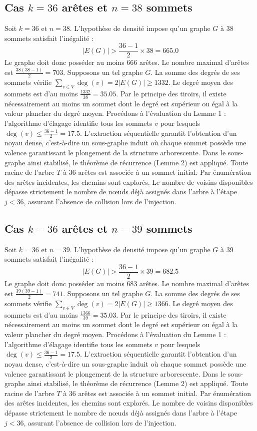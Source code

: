 \documentclass[12pt,a4paper]{article}
\begin{document}
\subsection{Cas $k = 36$ arêtes et $n = 38$ sommets}
Soit $k = 36$ et $n = 38$. L'hypothèse de densité impose qu'un graphe $G$ à 38 sommets satisfait l'inégalité :
$$ |E(G)| > \frac{36-1}{2} \times 38 = 665.0 $$
Le graphe doit donc posséder au moins $666$ arêtes. Le nombre maximal d'arêtes est $\frac{38(38-1)}{2} = 703$.
Supposons un tel graphe $G$. La somme des degrés de ses sommets vérifie $\sum_{v \in V} \deg(v) = 2|E(G)| \geq 1332$.
Le degré moyen des sommets est d'au moins $\frac{1332}{38} = 35.05$.
Par le principe des tiroirs, il existe nécessairement au moins un sommet dont le degré est supérieur ou égal à la valeur plancher du degré moyen.
Procédons à l'évaluation du Lemme 1 : l'algorithme d'élagage identifie tous les sommets $v$ pour lesquels $\deg(v) \leq \frac{36-1}{2} = 17.5$.
L'extraction séquentielle garantit l'obtention d'un noyau dense, c'est-à-dire un sous-graphe induit où chaque sommet possède une valence garantissant le plongement de la structure arborescente.
Dans le sous-graphe ainsi stabilisé, le théorème de récurrence (Lemme 2) est appliqué. Toute racine de l'arbre $T$ à 36 arêtes est associée à un sommet initial. Par énumération des arêtes incidentes, les chemins sont explorés. Le nombre de voisins disponibles dépasse strictement le nombre de nœuds déjà assignés dans l'arbre à l'étape $j < 36$, assurant l'absence de collision lors de l'injection.

\subsection{Cas $k = 36$ arêtes et $n = 39$ sommets}
Soit $k = 36$ et $n = 39$. L'hypothèse de densité impose qu'un graphe $G$ à 39 sommets satisfait l'inégalité :
$$ |E(G)| > \frac{36-1}{2} \times 39 = 682.5 $$
Le graphe doit donc posséder au moins $683$ arêtes. Le nombre maximal d'arêtes est $\frac{39(39-1)}{2} = 741$.
Supposons un tel graphe $G$. La somme des degrés de ses sommets vérifie $\sum_{v \in V} \deg(v) = 2|E(G)| \geq 1366$.
Le degré moyen des sommets est d'au moins $\frac{1366}{39} = 35.03$.
Par le principe des tiroirs, il existe nécessairement au moins un sommet dont le degré est supérieur ou égal à la valeur plancher du degré moyen.
Procédons à l'évaluation du Lemme 1 : l'algorithme d'élagage identifie tous les sommets $v$ pour lesquels $\deg(v) \leq \frac{36-1}{2} = 17.5$.
L'extraction séquentielle garantit l'obtention d'un noyau dense, c'est-à-dire un sous-graphe induit où chaque sommet possède une valence garantissant le plongement de la structure arborescente.
Dans le sous-graphe ainsi stabilisé, le théorème de récurrence (Lemme 2) est appliqué. Toute racine de l'arbre $T$ à 36 arêtes est associée à un sommet initial. Par énumération des arêtes incidentes, les chemins sont explorés. Le nombre de voisins disponibles dépasse strictement le nombre de nœuds déjà assignés dans l'arbre à l'étape $j < 36$, assurant l'absence de collision lors de l'injection.
\end{document}
